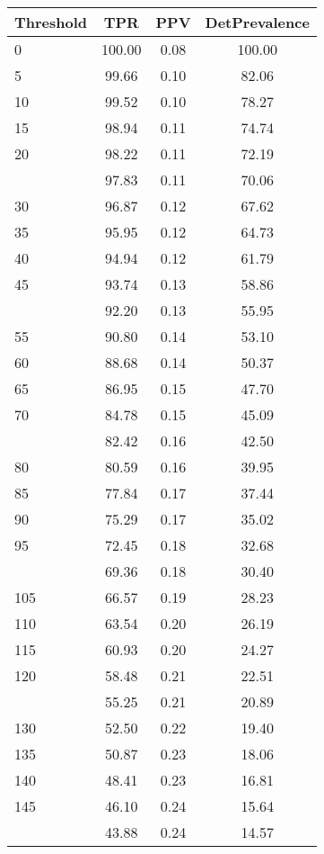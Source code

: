 \begin{table}[ht]
\centering
\begin{tabular}{lccc}
  \toprule
Threshold & TPR & PPV & DetPrevalence \\ 
  \midrule
0 & 100.00 & 0.08 & 100.00 \\ 
  5 & 99.66 & 0.10 & 82.06 \\ 
  10 & 99.52 & 0.10 & 78.27 \\ 
  15 & 98.94 & 0.11 & 74.74 \\ 
  20 & 98.22 & 0.11 & 72.19 \\ 
   \addlinespace
25 & 97.83 & 0.11 & 70.06 \\ 
  30 & 96.87 & 0.12 & 67.62 \\ 
  35 & 95.95 & 0.12 & 64.73 \\ 
  40 & 94.94 & 0.12 & 61.79 \\ 
  45 & 93.74 & 0.13 & 58.86 \\ 
   \addlinespace
50 & 92.20 & 0.13 & 55.95 \\ 
  55 & 90.80 & 0.14 & 53.10 \\ 
  60 & 88.68 & 0.14 & 50.37 \\ 
  65 & 86.95 & 0.15 & 47.70 \\ 
  70 & 84.78 & 0.15 & 45.09 \\ 
   \addlinespace
75 & 82.42 & 0.16 & 42.50 \\ 
  80 & 80.59 & 0.16 & 39.95 \\ 
  85 & 77.84 & 0.17 & 37.44 \\ 
  90 & 75.29 & 0.17 & 35.02 \\ 
  95 & 72.45 & 0.18 & 32.68 \\ 
   \addlinespace
100 & 69.36 & 0.18 & 30.40 \\ 
  105 & 66.57 & 0.19 & 28.23 \\ 
  110 & 63.54 & 0.20 & 26.19 \\ 
  115 & 60.93 & 0.20 & 24.27 \\ 
  120 & 58.48 & 0.21 & 22.51 \\ 
   \addlinespace
125 & 55.25 & 0.21 & 20.89 \\ 
  130 & 52.50 & 0.22 & 19.40 \\ 
  135 & 50.87 & 0.23 & 18.06 \\ 
  140 & 48.41 & 0.23 & 16.81 \\ 
  145 & 46.10 & 0.24 & 15.64 \\ 
   \addlinespace
150 & 43.88 & 0.24 & 14.57 \\ 

\end{tabular}
\end{table}
